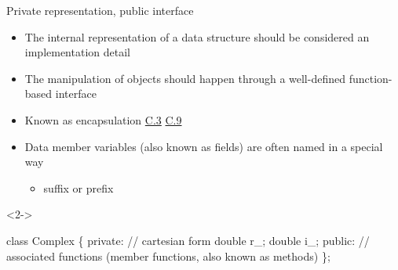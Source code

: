 \begin{frame}[fragile]{Private representation, public interface}

  \begin{itemize}
  \item The internal representation of a data structure should be considered an
    implementation detail
  \item The manipulation of objects should happen through a
    well-defined function-based interface
  \item Known as \alert{encapsulation}
    \href{https://isocpp.github.io/CppCoreGuidelines/CppCoreGuidelines#c3-represent-the-distinction-between-an-interface-and-an-implementation-using-a-class}{C.3} \href{https://isocpp.github.io/CppCoreGuidelines/CppCoreGuidelines#c9-minimize-exposure-of-members}{C.9}
  \item<2-> Data member variables (also known as fields) are often named in a
    special way
    \begin{itemize}
    \item \code{_} suffix or  prefix
    \end{itemize}
  \end{itemize}

\begin{codeblock}<2->{
\alert<2>{class} Complex \{
 \alert<2-4>{private}: // cartesian form
  double r_;
  double i_;
 \alert<2>{public}:
  // associated functions (member functions, also known as methods)
\};

}\end{codeblock}

\end{frame}

